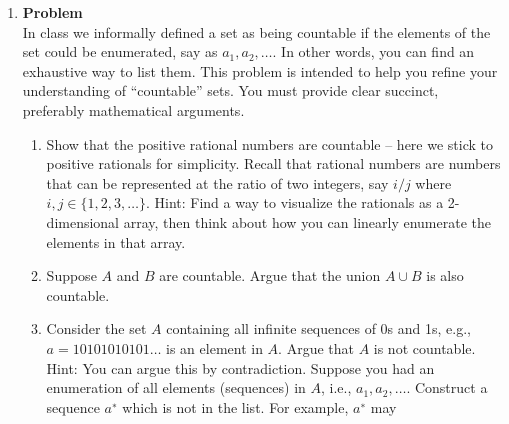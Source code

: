 \documentclass[12pt]{article}
\newenvironment{Ex}{\textbf{Problem}\vspace{.75em}\\}{}
\begin{document}
\begin{enumerate}
\begin{Ex}
\begin{solution}
\begin{enumerate}
\begin{equation*}
          \begin{aligned}
            P(A \cup B \cup C) &= P((A \cup B) \cup C) \\
            &= P((P(A) + P(B) - P(A \cap B)) \cup C) \\
            &= P(A) + P(C) - P(A \cap C) \\
            &\quad + P(B) + P(C) - P(B \cap C) \\
            &\quad - P(A \cap B) + P(C) - (P(A \cap B) \cap P(C)) \\
            &= P(A) + P(B) + P(C) - P(A \cap B) - P(A \cap C) - P(B
            \cap C) \\
            &\quad + P(A \cap B \cap C)
          \end{aligned}
        \end{equation*}
      \end{enumerate}
    \end{solution}
  \end{Ex}
\item 
  \begin{Ex}
    In class we informally defined a set as being countable if the
    elements of the set could be enumerated, say as
    $a_1,a_2,\ldots$. In other words, you can find an exhaustive way
    to list them. This problem is intended to help you refine your
    understanding of ``countable'' sets. You must provide clear
    succinct, preferably mathematical arguments.
    \begin{enumerate}
    \item Show that the positive rational numbers are countable --
      here we stick to positive rationals for simplicity. Recall that
      rational numbers are numbers that can be represented at the
      ratio of two integers, say $i/j$ where $i, j \in \{1, 2, 3,
      \ldots\}$. Hint: Find a way to visualize the rationals as a
      2-dimensional array, then think about how you can linearly
      enumerate the elements in that array.
    \item Suppose $A$ and $B$ are countable. Argue that the union $A
      \cup B$ is also countable.
    \item Consider the set $A$ containing all infinite sequences of 0s
      and 1s, e.g., $a = 10101010101\ldots$ is an element in
      $A$. Argue that $A$ is not countable. Hint: You can argue this
      by contradiction. Suppose you had an enumeration of all elements
      (sequences) in $A$, i.e., $a_1, a_2,\ldots$. Construct a
      sequence $a^∗$ which is not in the list. For example, $a^∗$ may

\end{enumerate}
\end{Ex}
\end{enumerate}
\end{document}
